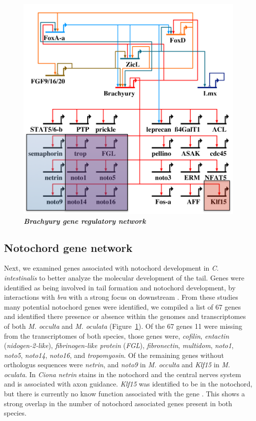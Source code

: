 \begin{figure}[tbp]
\centering
\includegraphics[scale=0.55]{figures/bra_grn.pdf}
\caption{\textbf{\textit{Brachyury gene regulatory network} }}
\label{fig:bra_grn}
\end{figure}
\subsection{Notochord gene network}

Next, we examined genes associated with notochord development in \textit{C. intestinalis} to better analyze the molecular development of the tail. Genes were identified as being involved in tail formation and notochord development, by interactions with \textit{bra} with a strong focus on downstream \cite{hotta_temporal_1999,hotta_characterization_2000,hotta_brachyury-downstream_2007,kugler_evolutionary_2008,kugler_evolutionary_2011}. From these studies many potential notochord genes were identified, we compiled a list of 67 genes and identified there presence or absence within the genomes and transcriptomes of both \textit{M. occulta} and \textit{M. oculata} (Figure~\ref{fig:bra_grn}). Of the 67 genes 11 were missing from the transcriptomes of both species, those genes were, \textit{cofilin}, \textit{entactin} (\textit{nidogen-2-like}), \textit{fibrinogen-like protein} (\textit{FGL}), \textit{fibronectin}, \textit{multidom}, \textit{noto1}, \textit{noto5}, \textit{noto14}, \textit{noto16}, and \textit{tropomyosin}. Of the remaining genes without orthologus sequences were \textit{netrin}, and \textit{noto9} in \textit{M. occulta} and \textit{Klf15} in \textit{M. oculata}. In \textit{Ciona} \textit{netrin} stains in the notochord and the central nerves system and is associated with axon guidance\cite{hotta_characterization_2000}. \textit{Klf15} was identified to be in the notochord, but there is currently no know function associated with the gene \cite{passamaneck_direct_2009}. This shows a strong overlap in the number of notochord associated genes present in both species.

